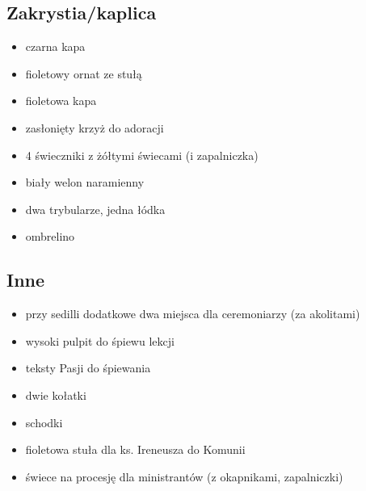 \subsection{Zakrystia/kaplica}

\begin{itemize}
    \item czarna kapa
    \item fioletowy ornat ze stułą
    \item fioletowa kapa
    \item zasłonięty krzyż do adoracji
    \item 4 świeczniki z żółtymi świecami (i zapalniczka)
    \item biały welon naramienny
    \item dwa trybularze, jedna łódka
    \item ombrelino
\end{itemize}

\subsection{Inne}

\begin{itemize}
    \item przy sedilli dodatkowe dwa miejsca dla ceremoniarzy (za akolitami)
    \item wysoki pulpit do śpiewu lekcji
    \item teksty Pasji do śpiewania
    \item dwie kołatki
    \item schodki
    \item fioletowa stuła dla ks. Ireneusza do Komunii
    \item świece na procesję dla ministrantów (z okapnikami, zapalniczki)
\end{itemize}
